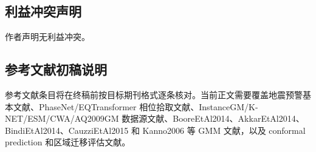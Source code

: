 \documentclass[
  11pt,
]{ctexart}
\begin{document}
\subsection{利益冲突声明}\label{ux5229ux76caux51b2ux7a81ux58f0ux660e}

作者声明无利益冲突。

\subsection{参考文献初稿说明}\label{ux53c2ux8003ux6587ux732eux521dux7a3fux8bf4ux660e}

参考文献条目将在终稿前按目标期刊格式逐条核对。当前正文需要覆盖地震预警基本文献、PhaseNet/EQTransformer
相位拾取文献、InstanceGM/K-NET/ESM/CWA/AQ2009GM
数据源文献、BooreEtAl2014、AkkarEtAl2014、BindiEtAl2014、CauzziEtAl2015
和 Kanno2006 等 GMM 文献，以及 conformal prediction 和区域迁移评估文献。
\end{document}
